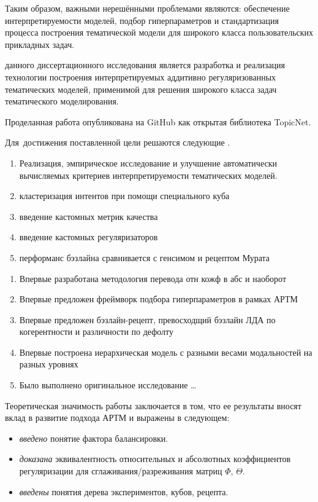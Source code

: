 Таким образом, важными нерешёнными проблемами являются: обеспечение  интерпретируемости моделей, подбор гиперпараметров и стандартизация процесса построения тематической модели для широкого класса пользовательских прикладных задач.

{\aim} данного диссертационного исследования является разработка и реализация технологии построения интерпретируемых аддитивно регуляризованных тематических моделей, применимой для решения широкого класса задач тематического моделирования. 

Проделанная работа опубликована на GitHub как открытая библиотека TopicNet.

Для~достижения поставленной цели решаются следующие {\tasks}.
\begin{enumerate}[beginpenalty=10000] %
  \item Реализация, эмпирическое исследование и улучшение автоматически вычисляемых критериев интерпретируемости тематических моделей.
  \item кластеризация интентов при помощи специального куба
  \item введение кастомных метрик качества
  \item введение кастомных регуляризаторов
  \item перформанс бэзлайна сравнивается с генсимом и рецептом Мурата
\end{enumerate}

{\novelty}
\begin{enumerate}[beginpenalty=10000] %
  \item Впервые разработана методология перевода отн кожф в абс и наоборот
  \item Впервые предложен фреймворк подбора гиперпараметров в рамках АРТМ
  \item Впервые предложен бэзлайн-рецепт, превосходщий бэзлайн ЛДА по когерентности и различности по дефолту
  \item Впервые построена иерархическая модель с разными весами модальностей на разных уровнях
  \item Было выполнено оригинальное исследование \ldots
\end{enumerate}

{\influence} 
Теоретическая значимость работы заключается в том, что ее результаты
вносят вклад в развитие подхода АРТМ и выражены в следующем:
\begin{itemize}
    \item \textit{введено} понятие фактора балансировки.
    \item \textit{доказана} эквивалентность относительных и абсолютных коэффициентов регуляризации для сглаживания/разреживания матриц $\Phi$, $\Theta$.
    \item \textit{введены} понятия дерева экспериментов, кубов, рецепта.
\end{itemize}

